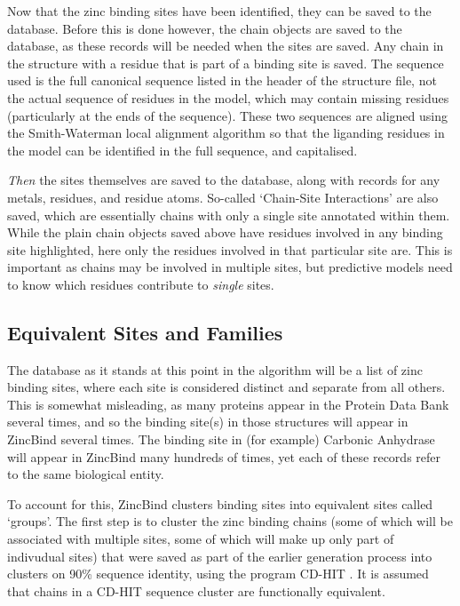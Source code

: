 Now that the zinc binding sites have been identified, they can be saved to the database. Before this is done however, the chain objects are saved to the database, as these records will be needed when the sites are saved. Any chain in the structure with a residue that is part of a binding site is saved. The sequence used is the full canonical sequence listed in the header of the structure file, not the actual sequence of residues in the model, which may contain missing residues (particularly at the ends of the sequence). These two sequences are aligned using the Smith-Waterman local alignment algorithm \cite{smith1981alignment} so that the liganding residues in the model can be identified in the full sequence, and capitalised.

\emph{Then} the sites themselves are saved to the database, along with records for any metals, residues, and residue atoms. So-called `Chain-Site Interactions' are also saved, which are essentially chains with only a single site annotated within them. While the plain chain objects saved above have residues involved in any binding site highlighted, here only the residues involved in that particular site are. This is important as chains may be involved in multiple sites, but predictive models need to know which residues contribute to \emph{single} sites.

\subsection{Equivalent Sites and Families}

The database as it stands at this point in the algorithm will be a list of zinc binding sites, where each site is considered distinct and separate from all others. This is somewhat misleading, as many proteins appear in the Protein Data Bank several times, and so the binding site(s) in those structures will appear in ZincBind several times. The binding site in (for example) Carbonic Anhydrase will appear in ZincBind many hundreds of times, yet each of these records refer to the same biological entity.

To account for this, ZincBind clusters binding sites into equivalent sites called `groups'. The first step is to cluster the zinc binding chains (some of which will be associated with multiple sites, some of which will make up only part of indivudual sites) that were saved as part of the earlier generation process into clusters on 90\% sequence identity, using the program CD-HIT \cite{li2006cdhit}. It is assumed that chains in a CD-HIT sequence cluster are functionally equivalent.

